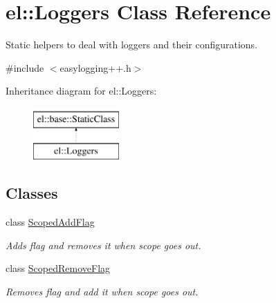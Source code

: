 \hypertarget{classel_1_1Loggers}{\section{el\-:\-:Loggers Class Reference}
\label{classel_1_1Loggers}
}


Static helpers to deal with loggers and their configurations.  




{\ttfamily \#include $<$easylogging++.\-h$>$}

Inheritance diagram for el\-:\-:Loggers\-:\begin{figure}[H]
\begin{center}
\leavevmode
\includegraphics[height=2.000000cm]{classel_1_1Loggers}
\end{center}
\end{figure}
\subsection*{Classes}
\begin{DoxyCompactItemize}
\item 
class \hyperlink{classel_1_1Loggers_1_1ScopedAddFlag}{Scoped\-Add\-Flag}
\begin{DoxyCompactList}\small\item\em Adds flag and removes it when scope goes out. \end{DoxyCompactList}\item 
class \hyperlink{classel_1_1Loggers_1_1ScopedRemoveFlag}{Scoped\-Remove\-Flag}
\begin{DoxyCompactList}\small\item\em Removes flag and add it when scope goes out. \end{DoxyCompactList}\end{DoxyCompactItemize}
